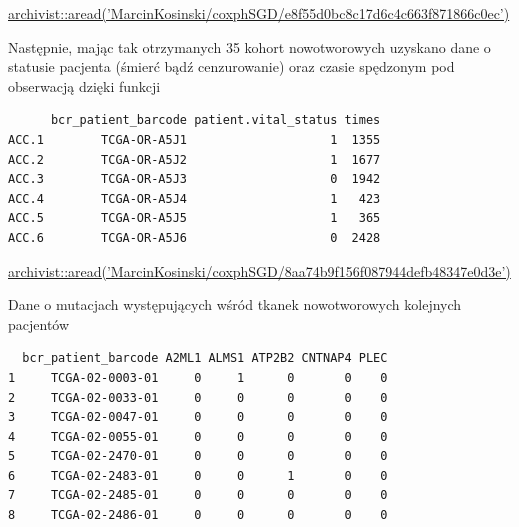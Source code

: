 \href{https://github.com/MarcinKosinski/coxphSGD/blob/master/gallery/e8f55d0bc8c17d6c4c663f871866c0ec.rda?raw=true}{archivist::aread('MarcinKosinski/coxphSGD/e8f55d0bc8c17d6c4c663f871866c0ec')}

Następnie, mając tak otrzymanych 35 kohort nowotworowych uzyskano dane o
statusie pacjenta (śmierć bądź cenzurowanie) oraz czasie spędzonym
pod obserwacją dzięki funkcji

\begin{Shaded}
\begin{Highlighting}[]
\NormalTok{(}\StringTok{ }
\end{Highlighting}
\end{Shaded}

\begin{verbatim}
      bcr_patient_barcode patient.vital_status times
ACC.1        TCGA-OR-A5J1                    1  1355
ACC.2        TCGA-OR-A5J2                    1  1677
ACC.3        TCGA-OR-A5J3                    0  1942
ACC.4        TCGA-OR-A5J4                    1   423
ACC.5        TCGA-OR-A5J5                    1   365
ACC.6        TCGA-OR-A5J6                    0  2428
\end{verbatim}

\href{https://github.com/MarcinKosinski/coxphSGD/blob/master/gallery/8aa74b9f156f087944defb48347e0d3e.rda?raw=true}{archivist::aread('MarcinKosinski/coxphSGD/8aa74b9f156f087944defb48347e0d3e')}

Dane o mutacjach występujących wśród tkanek nowotworowych kolejnych pacjentów 

\begin{Shaded}
\begin{Highlighting}[]
\NormalTok{) ->}\StringTok{ }
\NormalTok{mutationsData[}\NormalTok{:}\NormalTok{, }\NormalTok{(}\NormalTok{,}\NormalTok{,}\NormalTok{,}\NormalTok{,}\NormalTok{,}\NormalTok{)]}
\end{Highlighting}
\end{Shaded}

\begin{verbatim}
  bcr_patient_barcode A2ML1 ALMS1 ATP2B2 CNTNAP4 PLEC
1     TCGA-02-0003-01     0     1      0       0    0
2     TCGA-02-0033-01     0     0      0       0    0
3     TCGA-02-0047-01     0     0      0       0    0
4     TCGA-02-0055-01     0     0      0       0    0
5     TCGA-02-2470-01     0     0      0       0    0
6     TCGA-02-2483-01     0     0      1       0    0
7     TCGA-02-2485-01     0     0      0       0    0
8     TCGA-02-2486-01     0     0      0       0    0
\end{verbatim}

